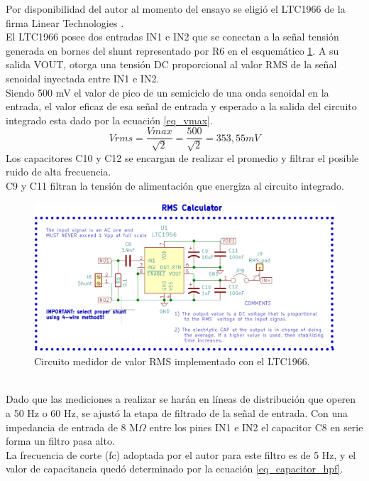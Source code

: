 Por disponibilidad del autor al momento del ensayo se eligió el LTC1966 de la firma Linear Technologies \citep{ad636}.\\
El LTC1966 posee dos entradas IN1 e IN2 que se conectan a la señal tensión generada en bornes del shunt representado por R6 en el esquemático \ref{fig:ctomedidorrms}. A su salida VOUT, otorga una tensión DC proporcional al valor RMS de la señal senoidal inyectada entre IN1 e IN2.\\
Siendo 500 mV el valor de pico de un semiciclo de una onda senoidal en la entrada, el valor eficaz de esa señal de entrada y esperado a la salida del circuito integrado esta dado por la ecuación \ref{eq_vmax}.
\begin{equation}
	\label{eq_vmax}
	Vrms=\frac{Vmax}{\sqrt{2}}=\frac{500}{\sqrt{2}}= 353,55 mV
\end{equation}
Los capacitores C10 y C12 se encargan de realizar el promedio y filtrar el posible ruido de alta frecuencia.\\
C9 y C11 filtran la tensión de alimentación que energiza al circuito integrado.\\
\begin{figure}[h!]
	\centering
	\includegraphics[width=1.0\linewidth]{Figures/cto_medidor_rms}
	\caption{Circuito medidor de valor RMS implementado con el LTC1966.}
	\label{fig:ctomedidorrms}
\end{figure}\\
Dado que las mediciones a realizar se harán en líneas de distribución que operen a 50 Hz o 60 Hz, se ajustó la etapa de filtrado de la señal de entrada. Con una impedancia de entrada de 8 M$\Omega$ entre los pines IN1 e IN2 el capacitor C8 en serie forma un filtro pasa alto.\\
La frecuencia de corte (fc) adoptada por el autor para este filtro es de 5 Hz, y el valor de capacitancia quedó determinado por la ecuación \ref{eq_capacitor_hpf}.
